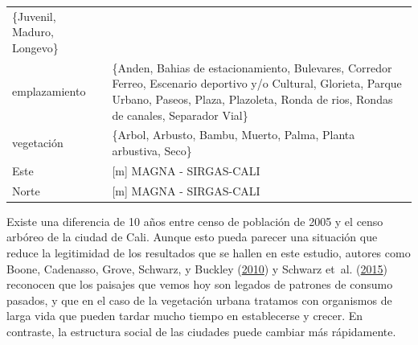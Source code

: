 \documentclass[12pt,a4paper,openany]{book}
\theoremstyle{definition}
\theoremstyle{definition}
\theoremstyle{definition}
\theoremstyle{remark}
\begin{document}
\begin{longtable}[]{@{}ll@{}}
\begin{minipage}[t]{0.42\columnwidth}
\{Juvenil, Maduro, Longevo\}\strut
\end{minipage}\tabularnewline
\begin{minipage}[t]{0.30\columnwidth}\raggedright\strut
emplazamiento\strut
\end{minipage} & \begin{minipage}[t]{0.42\columnwidth}\raggedright\strut
\{Anden, Bahias de estacionamiento, Bulevares, Corredor Ferreo,
Escenario deportivo y/o Cultural, Glorieta, Parque Urbano, Paseos,
Plaza, Plazoleta, Ronda de rios, Rondas de canales, Separador
Vial\}\strut
\end{minipage}\tabularnewline
\begin{minipage}[t]{0.30\columnwidth}\raggedright\strut
vegetación\strut
\end{minipage} & \begin{minipage}[t]{0.42\columnwidth}\raggedright\strut
\{Arbol, Arbusto, Bambu, Muerto, Palma, Planta arbustiva, Seco\}\strut
\end{minipage}\tabularnewline
\begin{minipage}[t]{0.30\columnwidth}\raggedright\strut
Este\strut
\end{minipage} & \begin{minipage}[t]{0.42\columnwidth}\raggedright\strut
{[}m{]} MAGNA - SIRGAS-CALI\strut
\end{minipage}\tabularnewline
\begin{minipage}[t]{0.30\columnwidth}\raggedright\strut
Norte\strut
\end{minipage} & \begin{minipage}[t]{0.42\columnwidth}\raggedright\strut
{[}m{]} MAGNA - SIRGAS-CALI\strut
\end{minipage}\tabularnewline
\bottomrule
\end{longtable}

Existe una diferencia de 10 años entre censo de población de 2005 y el
censo arbóreo de la ciudad de Cali. Aunque esto pueda parecer una
situación que reduce la legitimidad de los resultados que se hallen en
este estudio, autores como Boone, Cadenasso, Grove, Schwarz, y Buckley
(\protect\hyperlink{ref-boone2010landscape}{2010}) y Schwarz et~al.
(\protect\hyperlink{ref-schwarz_trees_2015}{2015}) reconocen que los
paisajes que vemos hoy son legados de patrones de consumo pasados, y que
en el caso de la vegetación urbana tratamos con organismos de larga vida
que pueden tardar mucho tiempo en establecerse y crecer. En contraste,
la estructura social de las ciudades puede cambiar más rápidamente.
\end{document}
